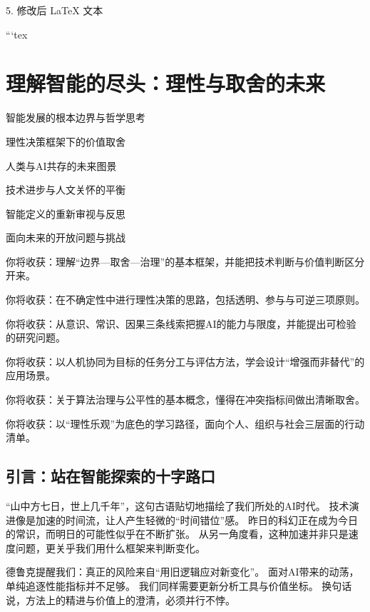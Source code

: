 
5. 修改后 LaTeX 文本

```tex
\chapter{理解智能的尽头：理性与取舍的未来}

\begin{introduction}
\item 智能发展的根本边界与哲学思考
\item 理性决策框架下的价值取舍
\item 人类与AI共存的未来图景
\item 技术进步与人文关怀的平衡
\item 智能定义的重新审视与反思
\item 面向未来的开放问题与挑战
\end{introduction}

\begin{introduction}
\item 你将收获：理解“边界—取舍—治理”的基本框架，并能把技术判断与价值判断区分开来。
\item 你将收获：在不确定性中进行理性决策的思路，包括透明、参与与可逆三项原则。
\item 你将收获：从意识、常识、因果三条线索把握AI的能力与限度，并能提出可检验的研究问题。
\item 你将收获：以人机协同为目标的任务分工与评估方法，学会设计“增强而非替代”的应用场景。
\item 你将收获：关于算法治理与公平性的基本概念，懂得在冲突指标间做出清晰取舍。
\item 你将收获：以“理性乐观”为底色的学习路径，面向个人、组织与社会三层面的行动清单。
\end{introduction}

\section{引言：站在智能探索的十字路口}

“山中方七日，世上几千年”，这句古语贴切地描绘了我们所处的AI时代。
技术演进像是加速的时间流，让人产生轻微的“时间错位”感。
昨日的科幻正在成为今日的常识，而明日的可能性似乎在不断扩张。
从另一角度看，这种加速并非只是速度问题，更关乎我们用什么框架来判断变化。

德鲁克提醒我们：真正的风险来自“用旧逻辑应对新变化”。
面对AI带来的动荡，单纯追逐性能指标并不足够。
我们同样需要更新分析工具与价值坐标。
换句话说，方法上的精进与价值上的澄清，必须并行不悖。


